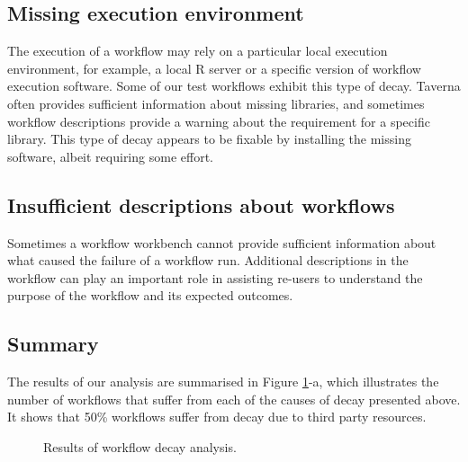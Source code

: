 \subsection{Missing execution environment}
The execution of a workflow may rely on a particular local execution environment, for example, a local R server or a specific version of workflow execution software. Some of our test workflows exhibit this type of decay. Taverna often provides sufficient information about missing libraries, and sometimes workflow descriptions provide a warning about the requirement for a specific library. This type of decay appears to be fixable by installing the missing software, albeit requiring some effort.

\subsection{Insufficient descriptions about workflows}
Sometimes a workflow workbench cannot provide sufficient information about what caused the failure of a workflow run. Additional descriptions in the workflow can play an important role in assisting re-users to understand the purpose of the workflow and its expected outcomes.


\subsection{Summary}
The results of our analysis are summarised in Figure \ref{fig:decay-analysis}-a, which illustrates the number of workflows that suffer from each of the causes of decay presented above. It shows that {50\%} workflows suffer from decay due to third party resources. 

\begin{figure}[ht]
\centering
{}
\caption{Results of workflow decay analysis.}
\label{fig:decay-analysis}
\end{figure}


